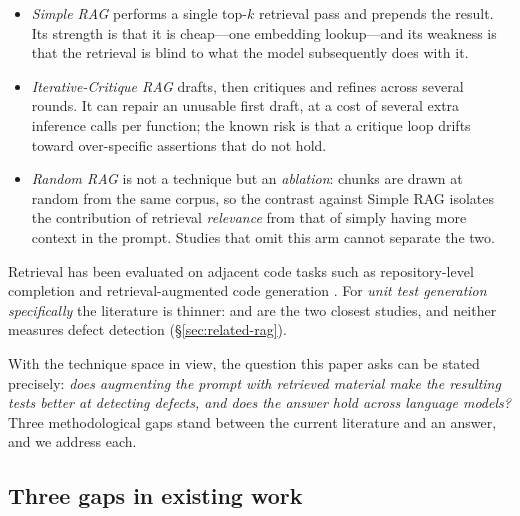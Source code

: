 \documentclass[smallextended]{svjour3}
\begin{document}
\begin{itemize}
\item \emph{Simple RAG} performs a single top-$k$ retrieval pass and
 prepends the result. Its strength is that it is cheap---one
 embedding lookup---and its weakness is that the retrieval is blind
 to what the model subsequently does with it.
\item \emph{Iterative-Critique RAG} drafts, then critiques and
 refines across several rounds. It can repair an unusable first
 draft, at a cost of several extra inference calls per function; the
 known risk is that a critique loop drifts toward over-specific
 assertions that do not hold.
\item \emph{Random RAG} is not a technique but an \emph{ablation}:
 chunks are drawn at random from the same corpus, so the contrast
 against Simple RAG isolates the contribution of retrieval
 \emph{relevance} from that of simply having more context in the
 prompt. Studies that omit this arm cannot separate the two.
\end{itemize}

\noindent Retrieval has been evaluated on adjacent code tasks such as
repository-level completion \citep{zhang2023repocoder} and
retrieval-augmented code generation \citep{su2025evor,lu2022reacc}.
For \emph{unit test generation specifically} the literature is
thinner: \citet{shin2026ragtest} and \citet{zhang2026refrag} are the
two closest studies, and neither measures defect detection
(\S\ref{sec:related-rag}).

\noindent With the technique space in view, the question this paper
asks can be stated precisely: \emph{does augmenting the prompt with
retrieved material make the resulting tests better at detecting
defects, and does the answer hold across language models?} Three
methodological gaps stand between the current literature and an
answer, and we address each.

\subsection{Three gaps in existing work}\label{sec:intro-gaps}
\end{document}
